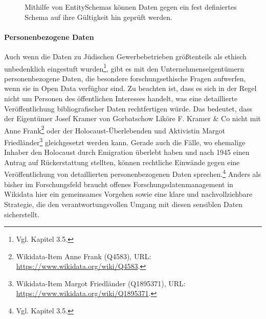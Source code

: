\begin{figure}[h]
    \centering
    \caption[EntitySchemas in Wikidata]{Mithilfe von EntitySchemas können Daten gegen ein fest definiertes Schema auf ihre Gültigkeit hin geprüft werden.}
    \label{fig:wikidataentityschema}
\end{figure}

\paragraph{Personenbezogene Daten}

Auch wenn die Daten zu Jüdischen Gewerbebetrieben größtenteils als ethisch unbedenklich eingestuft wurden\footnote{Vgl. Kapitel 3.5.}, gibt es mit den Unternehmenseigentümern personenbezogene Daten, die besondere forschungsethische Fragen aufwerfen, wenn sie in Open Data verfügbar sind. Zu beachten ist, dass es sich in der Regel nicht um Personen des öffentlichen Interesses handelt, was eine detaillierte Veröffentlichung bibliografischer Daten rechtfertigen würde. Das bedeutet, dass der Eigentümer Josef Kramer von Gorbatschow Liköre F. Kramer \& Co nicht mit Anne Frank\footnote{Wikidata-Item Anne Frank (Q4583), URL: \url{https://www.wikidata.org/wiki/Q4583}.} oder der Holocaust-Überlebenden und Aktivistin Margot Friedländer\footnote{Wikidata-Item Margot Friedländer (Q1895371), URL: \url{https://www.wikidata.org/wiki/Q1895371}.} gleichgesetzt werden kann. Gerade auch die Fälle, wo ehemalige Inhaber den Holocaust durch Emigration überlebt haben und nach 1945 einen Antrag auf Rückerstattung stellten, können rechtliche Einwände gegen eine Veröffentlichung von detaillierten personenbezogenen Daten sprechen.\footnote{Vgl. Kapitel 3.5.} Anders als bisher im Forschungsfeld braucht offenes Forschungsdatenmanagement in Wikidata hier ein gemeinsames Vorgehen sowie eine klare und nachvollziehbare Strategie, die den verantwortungsvollen Umgang mit diesen sensiblen Daten sicherstellt. 

